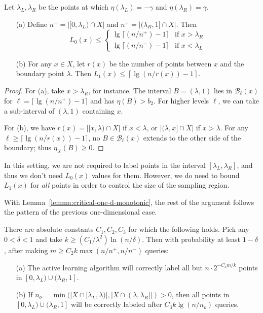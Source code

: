 \documentclass[anon,12pt]{colt2022} %
\def\B{{\mathcal B}}
\begin{document}
\begin{lemma}
Let $\lambda_L, \lambda_R$ be the points at which $\eta(\lambda_L) = -\gamma$ and $\eta(\lambda_R) = \gamma$.
\begin{enumerate}
\item[(a)] Define $n^- = |[0,\lambda_L) \cap X|$ and $n^+ = |(\lambda_R,1] \cap X|$. Then
$$
L_0(x)
\leq
\left\{
\begin{array}{ll}
\lg \lceil (n/n^+) - 1 \rceil & \mbox{if $x > \lambda_R$} \\
\lg \lceil (n/n^-) -1 \rceil & \mbox{if $x < \lambda_L$}
\end{array}
\right.
$$
\item[(b)] For any $x \in X$, let $r(x)$ be the number of points between $x$ and the boundary point $\lambda$. Then
$L_1(x) \leq \left\lceil \lg (n/r(x)) -1 \right\rceil$.
\end{enumerate}
\label{lemma:critical-one-d-monotonic}
\end{lemma}

\begin{proof}
For (a), take $x > \lambda_R$, for instance. The interval $B = (\lambda,1)$ lies in $\B_\ell(x)$ for $\ell = \lceil \lg (n/n^+) - 1 \rceil$ and has $\eta(B) > b_2$. For higher levels $\ell$, we can take a sub-interval of $(\lambda, 1)$ containing $x$.

For (b), we have $r(x) = |[x,\lambda) \cap X|$ if $x < \lambda$, or $|(\lambda, x] \cap X|$ if $x > \lambda$. For any $\ell \geq \lceil \lg (n/r(x)) - 1 \rceil$, no $B \in \B_\ell(x)$ extends to the other side of the boundary; thus $\eta_X(B) \geq 0$.
\end{proof}

In this setting, we are not required to label points in the interval $[\lambda_L, \lambda_R]$, and thus we don't need $L_0(x)$ values for them. However, we do need to bound $L_1(x)$ for \emph{all} points in order to control the size of the sampling region.

With Lemma~\ref{lemma:critical-one-d-monotonic}, the rest of the argument follows the pattern of the previous one-dimensional case.

\begin{theorem}
There are absolute constants $C_1, C_2, C_3$ for which the following holds. Pick any $0 < \delta < 1$ and take $k \geq (C_1/\lambda^2) \ln (n/\delta)$. Then with probability at least $1-\delta$, after making $m \geq C_2 k \max(n/n^+, n/n^-)$ queries:
\begin{enumerate}
\item[(a)] The active learning algorithm will correctly label all but $n \cdot 2^{-C_3 m/k}$ points in $[0,\lambda_L) \cup (\lambda_R,1]$. 
\item[(b)] If $n_o = \min(|X \cap [\lambda_L,\lambda)|, |X \cap (\lambda,\lambda_R]|) > 0$, then all points in $[0,\lambda_L) \cup (\lambda_R,1]$ will be correctly labeled after $C_3 k \lg (n/n_o)$ queries.
\end{enumerate}
\label{thm:one-d-monotonic}
\end{theorem}
\end{document}

